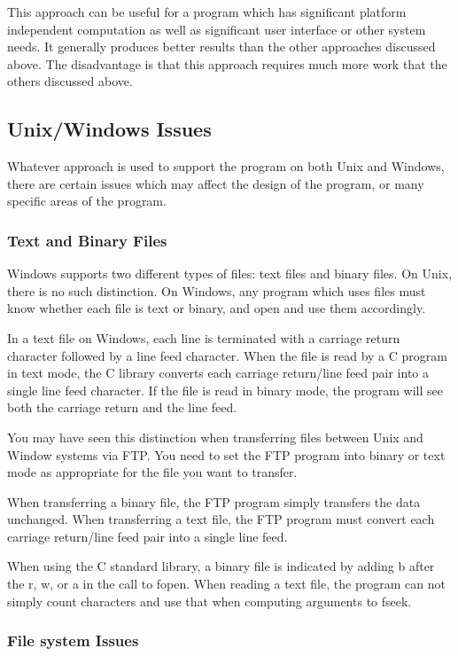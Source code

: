 This approach can be useful for a program which has significant platform independent computation as well as significant user interface or other system needs. It generally produces better results than the other approaches discussed above. The disadvantage is that this approach requires much more work that the others discussed above. 

\subsection{Unix/Windows Issues}

Whatever approach is used to support the program on both Unix and Windows, there are certain issues which may affect the design of the program, or many specific areas of the program. 

\subsubsection{Text and Binary Files}\label{SSS_Text_and_Binary_Files}

Windows supports two different types of files: text files and binary files. On Unix, there is no such distinction. On Windows, any program which uses files must know whether each file is text or binary, and open and use them accordingly.

In a text file on Windows, each line is terminated with a carriage return character followed by a line feed character. When the file is read by a C program in text mode, the C library converts each carriage return/line feed pair into a single line feed character. If the file is read in binary mode, the program will see both the carriage return and the line feed.

You may have seen this distinction when transferring files between Unix and Window systems via FTP. You need to set the FTP program into binary or text mode as appropriate for the file you want to transfer.

When transferring a binary file, the FTP program simply transfers the data unchanged. When transferring a text file, the FTP program must convert each carriage return/line feed pair into a single line feed.

When using the C standard library, a binary file is indicated by adding b after the r, w, or a in the call to fopen. When reading a text file, the program can not simply count characters and use that when computing arguments to fseek. 

\subsubsection{File system Issues}

